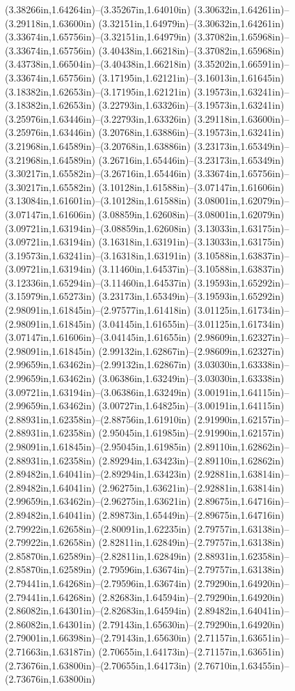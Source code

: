 (3.38266in,1.64264in)--(3.35267in,1.64010in) (3.30632in,1.64261in)--(3.29118in,1.63600in) (3.32151in,1.64979in)--(3.30632in,1.64261in) (3.33674in,1.65756in)--(3.32151in,1.64979in) (3.37082in,1.65968in)--(3.33674in,1.65756in) (3.40438in,1.66218in)--(3.37082in,1.65968in) (3.43738in,1.66504in)--(3.40438in,1.66218in) (3.35202in,1.66591in)--(3.33674in,1.65756in) (3.17195in,1.62121in)--(3.16013in,1.61645in) (3.18382in,1.62653in)--(3.17195in,1.62121in) (3.19573in,1.63241in)--(3.18382in,1.62653in) (3.22793in,1.63326in)--(3.19573in,1.63241in) (3.25976in,1.63446in)--(3.22793in,1.63326in) (3.29118in,1.63600in)--(3.25976in,1.63446in) (3.20768in,1.63886in)--(3.19573in,1.63241in) (3.21968in,1.64589in)--(3.20768in,1.63886in) (3.23173in,1.65349in)--(3.21968in,1.64589in) (3.26716in,1.65446in)--(3.23173in,1.65349in) (3.30217in,1.65582in)--(3.26716in,1.65446in) (3.33674in,1.65756in)--(3.30217in,1.65582in) (3.10128in,1.61588in)--(3.07147in,1.61606in) (3.13084in,1.61601in)--(3.10128in,1.61588in) (3.08001in,1.62079in)--(3.07147in,1.61606in) (3.08859in,1.62608in)--(3.08001in,1.62079in) (3.09721in,1.63194in)--(3.08859in,1.62608in) (3.13033in,1.63175in)--(3.09721in,1.63194in) (3.16318in,1.63191in)--(3.13033in,1.63175in) (3.19573in,1.63241in)--(3.16318in,1.63191in) (3.10588in,1.63837in)--(3.09721in,1.63194in) (3.11460in,1.64537in)--(3.10588in,1.63837in) (3.12336in,1.65294in)--(3.11460in,1.64537in) (3.19593in,1.65292in)--(3.15979in,1.65273in) (3.23173in,1.65349in)--(3.19593in,1.65292in) (2.98091in,1.61845in)--(2.97577in,1.61418in) (3.01125in,1.61734in)--(2.98091in,1.61845in) (3.04145in,1.61655in)--(3.01125in,1.61734in) (3.07147in,1.61606in)--(3.04145in,1.61655in) (2.98609in,1.62327in)--(2.98091in,1.61845in) (2.99132in,1.62867in)--(2.98609in,1.62327in) (2.99659in,1.63462in)--(2.99132in,1.62867in) (3.03030in,1.63338in)--(2.99659in,1.63462in) (3.06386in,1.63249in)--(3.03030in,1.63338in) (3.09721in,1.63194in)--(3.06386in,1.63249in) (3.00191in,1.64115in)--(2.99659in,1.63462in) (3.00727in,1.64825in)--(3.00191in,1.64115in) (2.88931in,1.62358in)--(2.88756in,1.61910in) (2.91990in,1.62157in)--(2.88931in,1.62358in) (2.95045in,1.61985in)--(2.91990in,1.62157in) (2.98091in,1.61845in)--(2.95045in,1.61985in) (2.89110in,1.62862in)--(2.88931in,1.62358in) (2.89294in,1.63423in)--(2.89110in,1.62862in) (2.89482in,1.64041in)--(2.89294in,1.63423in) (2.92881in,1.63814in)--(2.89482in,1.64041in) (2.96275in,1.63621in)--(2.92881in,1.63814in) (2.99659in,1.63462in)--(2.96275in,1.63621in) (2.89675in,1.64716in)--(2.89482in,1.64041in) (2.89873in,1.65449in)--(2.89675in,1.64716in) (2.79922in,1.62658in)--(2.80091in,1.62235in) (2.79757in,1.63138in)--(2.79922in,1.62658in) (2.82811in,1.62849in)--(2.79757in,1.63138in) (2.85870in,1.62589in)--(2.82811in,1.62849in) (2.88931in,1.62358in)--(2.85870in,1.62589in) (2.79596in,1.63674in)--(2.79757in,1.63138in) (2.79441in,1.64268in)--(2.79596in,1.63674in) (2.79290in,1.64920in)--(2.79441in,1.64268in) (2.82683in,1.64594in)--(2.79290in,1.64920in) (2.86082in,1.64301in)--(2.82683in,1.64594in) (2.89482in,1.64041in)--(2.86082in,1.64301in) (2.79143in,1.65630in)--(2.79290in,1.64920in) (2.79001in,1.66398in)--(2.79143in,1.65630in) (2.71157in,1.63651in)--(2.71663in,1.63187in) (2.70655in,1.64173in)--(2.71157in,1.63651in) (2.73676in,1.63800in)--(2.70655in,1.64173in) (2.76710in,1.63455in)--(2.73676in,1.63800in) 